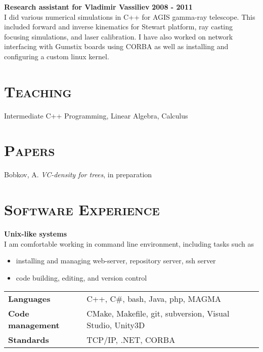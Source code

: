 \documentclass[margin, 10pt]{res} %
\begin{document}
\begin{resume}
\textbf{Research assistant for Vladimir Vassiliev} \hfill \textbf{2008 - 2011}\\
I did various numerical simulations in C++ for AGIS gamma-ray telescope. This included forward and inverse kinematics for Stewart platform, ray casting focusing simulations, and laser calibration. I have also worked on network interfacing with Gumstix boards using CORBA as well as installing and configuring a custom linux kernel. 

 
\section{\textsc{Teaching}}

Intermediate C++ Programming, Linear Algebra, Calculus

 
\section{\textsc{Papers}}

Bobkov, A. {\it VC-density for trees}, in preparation


 
\section{\textsc{Software Experience}}

\textbf{Unix-like systems}\\
I am comfortable working in command line environment, including tasks such as
\begin{itemize}
	\item installing and managing web-server, repository server, ssh server
	\item code building, editing, and version control
\end{itemize}

\begin{tabular}{ll}
\textbf{Languages} & C++, C\#, bash, Java, php, MAGMA \\
\textbf{Code management} & CMake, Makefile, git, subversion, Visual Studio, Unity3D \\
\textbf{Standards} & TCP/IP, .NET, CORBA  \\
\end{tabular}


\end{resume}
\end{document}
